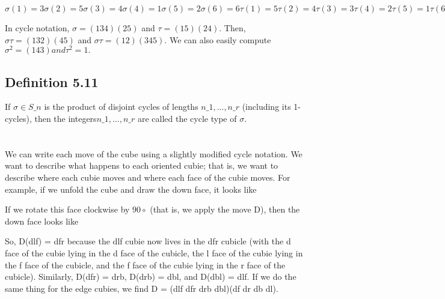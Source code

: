 $\sigma(1) = 3 \sigma(2) = 5 \sigma(3) = 4 \sigma(4) = 1 \sigma(5) = 2 \sigma(6) = 6
\tau(1) = 5 \tau(2) = 4 \tau(3) = 3 \tau(4) = 2 \tau(5) = 1 \tau(6) = 6$

In cycle notation, $\sigma = (1 3 4)(2 5)$ and $\tau = (1 5)(2 4)$. Then, $\sigma \tau= (1 3 2) (4 5)$ and $\sigma \tau= (1 2)(3 4 5)$. We
can also easily compute $\sigma^2 = (1 4 3) and \tau^2 = 1.$

\subsection{Definition 5.11} If $\sigma \in S\_n$ is the product of disjoint cycles of lengths $n\_1, . . . , n\_r$ (including its 1-cycles),
then the integers$ n\_1, . . . , n\_r$ are called the cycle type of $\sigma$.

\section{\rubik{}}

We can write each move of the \rubik{} cube using a slightly modified cycle notation. We want to describe
what happens to each oriented cubie; that is, we want to describe where each cubie moves and where each
face of the cubie moves. For example, if we unfold the cube and draw the down face, it looks like

If we rotate this face clockwise by $90\circ$ (that is, we apply the move D), then the down face looks like

So, D(dlf) = dfr because the dlf cubie now lives in the dfr cubicle (with the d face of the cubie lying in the d
face of the cubicle, the l face of the cubie lying in the f face of the cubicle, and the f face of the cubie lying
in the r face of the cubicle). Similarly, D(dfr) = drb, D(drb) = dbl, and D(dbl) = dlf. If we do the same thing
for the edge cubies, we find D = (dlf dfr drb dbl)(df dr db dl).

\myTail{
}
%